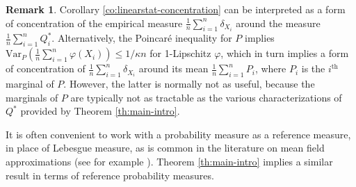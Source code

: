 \documentclass[11pt,reqno]{amsart}
\numberwithin{equation}{section}
\theoremstyle{definition}
\newtheorem{remark}[theorem]{Remark}
\def\Var{{\mathrm{Var}}}
\begin{document}
\begin{remark} 
	Corollary \ref{co:linearstat-concentration} can be interpreted as a form of concentration of the empirical measure $\frac{1}{n}\sum_{i=1}^n \delta_{X_i}$ around the measure $\frac{1}{n}\sum_{i=1}^n Q^*_i$. Alternatively, the Poincar\'e inequality for $P$ implies $\Var_P(\frac{1}{n}\sum_{i=1}^n\varphi(X_i)) \le 1/\kappa n$ for 1-Lipschitz $\varphi$, which in turn implies a form of concentration of $\frac{1}{n}\sum_{i=1}^n \delta_{X_i}$ around its mean $\frac{1}{n}\sum_{i=1}^n P_i$, where $P_i$ is the $i^\text{th}$ marginal of $P$. However, the latter is normally not as useful, because the marginals of $P$ are typically not as tractable as the various characterizations of $Q^*$ provided by Theorem \ref{th:main-intro}.
\end{remark}


It is often convenient to work with a probability measure as a reference measure, in place of Lebesgue measure, as is common in the literature on mean field approximations (see for example \cite{augeri1,austin2019structure,chatterjee-dembo,eldan1,yan2020nonlinear}). Theorem \ref{th:main-intro} implies a similar result in terms of reference probability measures.
\end{document}
